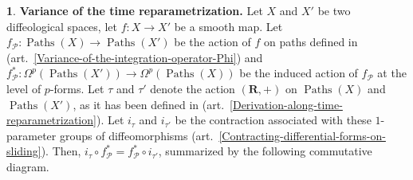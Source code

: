 \documentclass[11pt,reqno]{amsart}
\theoremstyle{definition}
\newtheorem{article}{}
\newcommand{\artlabel}[1]{{\bf #1.}}
\newcommand{\RR}{{\mathbf R}}
\def \X{{X}}
\newcommand{\cP}{{\mathcal P}}
\newcommand{\art}[1]{{(art.~\ref{#1})}}
\newcommand{\DForms}{\Omega}
\newcommand{\Paths}{\operatorname{Paths}}
\def \fPaths#1{#1_{\cP}}
\begin{document}
  \begin{article}\artlabel{Variance of the time reparametrization}
    \label{Variance-of-time-reparametrization}
    Let $\X$ and $\X'$ be two diffeological spaces,
    let $f: \X \to \X'$ be a smooth map. Let
    $\fPaths{f}: \Paths(\X) \to \Paths(\X')$ be the action of
    $f$ on paths defined in
    \art{Variance-of-the-integration-operator-Phi} and
    $\fPaths{f}^*: \DForms^p(\Paths(\X')) \to
      \DForms^p(\Paths(\X))$ be the induced action of
    $\fPaths{f}$ at the level of $p$-forms. Let $\tau$ and
    $\tau'$ denote the action $(\RR,+)$ on $\Paths(\X)$ and
    $\Paths(\X')$, as it has been defined in
    \art{Derivation-along-time-reparametrization}. Let
    $i_\tau$ and $i_{\tau'}$ be the contraction associated
    with these $1$-parameter groups of diffeomorphisms
    \art{Contracting-differential-forms-on-sliding}. Then,
    $i_{\tau} \circ \fPaths{f}^* = \fPaths{f}^* \circ
      i_{\tau'}$, summarized by the following
    commutative diagram.
    \begin{center}
    \end{center}
  \end{article} %
  
\end{document}
